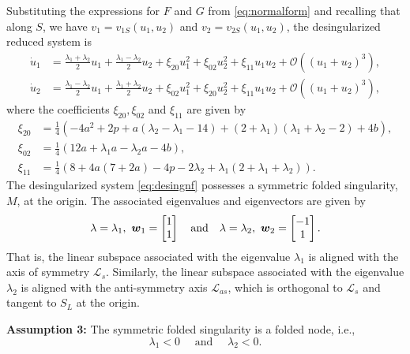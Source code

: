 \documentclass[10pt,onecolumn]{article}
\theoremstyle{plain}
\begin{document}
Substituting the expressions for $F$ and $G$ from \eqref{eq:normalform} and recalling that along $S$, we have $v_1=v_{1S}(u_1,u_2)$ and $v_2=v_{2S}(u_1,u_2)$, the desingularized reduced system is 
%
\begin{equation} \label{eq:desingnf}
  \begin{split}
    \dot u_1 &= \tfrac{\lambda_1+\lambda_2}{2} u_1 + \tfrac{\lambda_1 - \lambda_2}{2} u_2 + \xi_{20} u_1^2 + \xi_{02} u_2^2 + \xi_{11} u_1 u_2 + \mathcal O \left( (u_1+u_2)^3 \right), \\ 
    \dot u_2 &= \tfrac{\lambda_1-\lambda_2}{2} u_1 + \tfrac{\lambda_1+\lambda_2}{2} u_2 + \xi_{02} u_1^2 + \xi_{20} u_2^2 + \xi_{11} u_1 u_2 + \mathcal O \left( (u_1+u_2)^3 \right),
  \end{split}
\end{equation}
%
where the coefficients $\xi_{20}, \xi_{02}$ and $\xi_{11}$ are given by
%
\begin{equation*} 
  \begin{split}
	\xi_{20} &= \tfrac{1}{4} \left( -4a^2+2p+a(\lambda_2-\lambda_1-14)+(2+\lambda_1)(\lambda_1+\lambda_2-2)+4b \right), \\
	\xi_{02} &= \tfrac{1}{4} \left( 12a+\lambda_1 a -\lambda_2 a - 4b \right), \\ 
	\xi_{11} &= \tfrac{1}{4} \left( 8+4a(7+2a)-4p-2\lambda_2+\lambda_1(2+\lambda_1+\lambda_2) \right).
  \end{split}
\end{equation*}
%
The desingularized system \eqref{eq:desingnf} possesses a symmetric folded singularity, $M$, at the origin. 
The associated eigenvalues and eigenvectors are given by 
%
\[ \lambda=\lambda_1, \,\, \boldsymbol w_1 = \begin{bmatrix} 1 \\ 1 \end{bmatrix} \quad {\rm and } \quad \lambda = \lambda_2, \,\, \boldsymbol w_2 = \begin{bmatrix} -1 \\ 1 \end{bmatrix}. \]
%
That is, the linear subspace associated with the eigenvalue $\lambda_1$ is aligned with the axis of symmetry $\mathcal L_s$.
Similarly, the linear subspace associated with the eigenvalue $\lambda_2$ is aligned with the anti-symmetry axis $\mathcal L_{as}$, which is orthogonal to $\mathcal L_s$ and tangent to $S_L$ at the origin.  

{\bf Assumption 3:} The symmetric folded singularity is a folded node, i.e.,
%
\[ \lambda_1 <0 \quad \text{ and } \quad \lambda_2 < 0. \]
%
\end{document}
